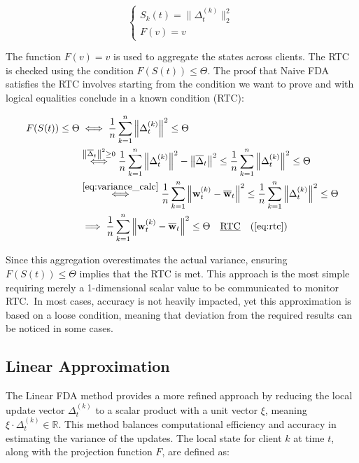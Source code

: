 \begin{equation}
    \begin{cases}
        S_k(t) = \|\Delta_t^{(k)}\|_2^2 \\
        F\left(v\right) = v
    \end{cases}
    \label{eq:naive}
\end{equation}

\noindent
The function $F(v) = v$ is used to aggregate the states across clients. The RTC is checked using the condition $F(S(t)) \leq \Theta$.
The proof that Naive FDA satisfies the RTC involves starting from the condition we want to prove and with logical equalities
conclude in a known condition (RTC):

\begin{align}
    F(S(t)) \leq \Theta & \iff \frac{1}{n}\sum_{k=1}^{n} \left\|\Delta_{t}^{(k)}\right\|^2 \leq \Theta \notag                                                                                                                                                                     \\
                        & \overset{\left\| \overline{\Delta}_t \right\|^2 \geq 0}{\iff} \frac{1}{n} \sum_{k=1}^{n} \left\|\Delta_{t}^{(k)}\right\|^2 - \left\| \overline{\Delta}_t \right\|^2 \leq \frac{1}{n}\sum_{k=1}^{n} \left\|\Delta_{t}^{(k)}\right\|^2 \leq \Theta \notag \\
                        & \overset{\ref{eq:variance_calc}}{\iff} \frac{1}{n}\sum_{k=1}^{n} \left\| \mathbf{w}_t^{(k)} - \overline{\mathbf{w}}_t \right\|^2 \leq \frac{1}{n}\sum_{k=1}^{n} \left\|\Delta_{t}^{(k)}\right\|^2 \leq \Theta \notag                                    \\
                        & \implies \frac{1}{n}\sum_{k=1}^{n} \left\| \mathbf{w}_t^{(k)} - \overline{\mathbf{w}}_t \right\|^2 \leq \Theta \quad \text{\underline{RTC}} \quad (\Cref{eq:rtc})
\end{align}

\noindent
Since this aggregation overestimates the actual variance, ensuring $F(S(t)) \leq \Theta$ implies that the RTC is met.
This approach is the most simple requiring merely a 1-dimensional scalar value to be communicated to monitor RTC.\ In most cases, accuracy
is not heavily impacted, yet this approximation is based on a loose condition, meaning that deviation from the required
results can be noticed in some cases.

\subsection{Linear Approximation}
The Linear FDA method provides a more refined approach by reducing the local update vector $\Delta_t^{(k)}$ to a scalar product with a unit vector $\xi$, meaning
$\xi \cdot \Delta_t^{(k)} \in \mathbb{R}$.
This method balances computational efficiency and accuracy in estimating the variance of the updates. The local state for
client $k$ at time $t$, along with the projection function $F$, are defined as:

